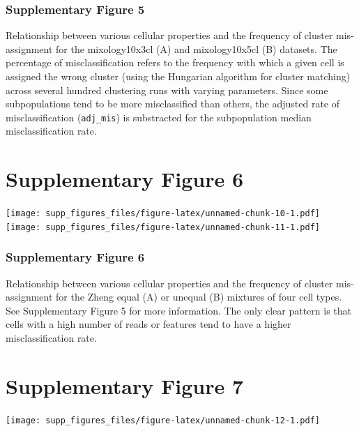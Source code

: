 \documentclass[]{article}
\begin{document}
\hypertarget{supplementary-figure-5-1}{%
\subsubsection{Supplementary Figure 5}\label{supplementary-figure-5-1}}

Relationship between various cellular properties and the frequency of
cluster mis-assignment for the mixology10x3cl (A) and mixology10x5cl (B)
datasets. The percentage of misclassification refers to the frequency
with which a given cell is assigned the wrong cluster (using the
Hungarian algorithm for cluster matching) across several hundred
clustering runs with varying parameters. Since some subpopulations tend
to be more misclassified than others, the adjusted rate of
misclassification (\texttt{adj\_mis}) is substracted for the
subpopulation median misclassification rate.

\newpage

\hypertarget{supplementary-figure-6}{%
\section{Supplementary Figure 6}\label{supplementary-figure-6}}

\texttt{[image: supp\_figures\_files/figure-latex/unnamed-chunk-10-1.pdf]}
\vfill
\texttt{[image: supp\_figures\_files/figure-latex/unnamed-chunk-11-1.pdf]}

\hypertarget{supplementary-figure-6-1}{%
\subsubsection{Supplementary Figure 6}\label{supplementary-figure-6-1}}

Relationship between various cellular properties and the frequency of
cluster mis-assignment for the Zheng equal (A) or unequal (B) mixtures
of four cell types. See Supplementary Figure 5 for more information. The
only clear pattern is that cells with a high number of reads or features
tend to have a higher misclassification rate.

\newpage

\hypertarget{supplementary-figure-7}{%
\section{Supplementary Figure 7}\label{supplementary-figure-7}}

\texttt{[image: supp\_figures\_files/figure-latex/unnamed-chunk-12-1.pdf]}
\end{document}
